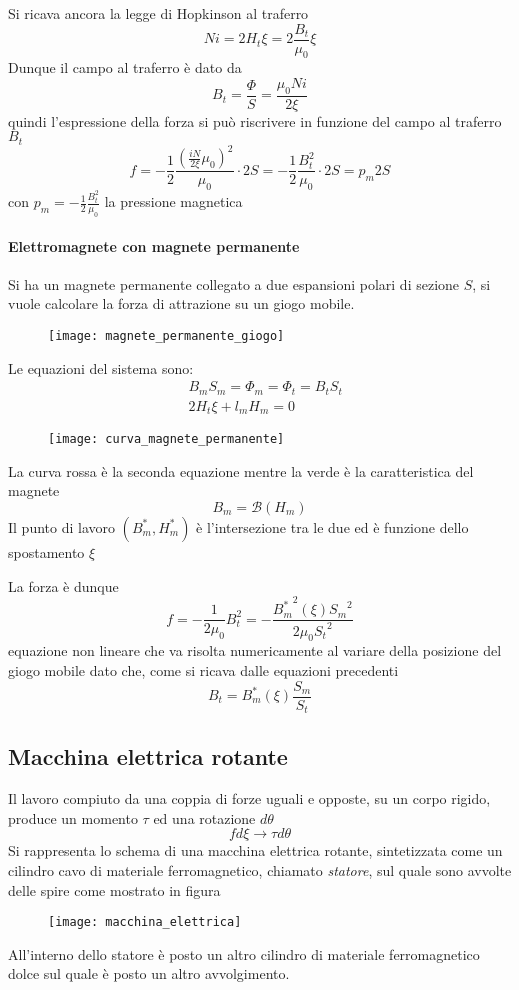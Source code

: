 Si ricava ancora la legge di Hopkinson al traferro
$$
Ni = 2H_t\xi = 2\frac{B_t}{\mu_0}\xi
$$
Dunque il campo al traferro è dato da
$$
B_t = \frac{\Phi}{S} = \frac{\mu_0Ni}{2\xi} 
$$
quindi l'espressione della forza si può riscrivere in funzione del campo al traferro $B_t$
$$
f = -\frac{1}{2}\frac{\left(\frac{iN}{2\xi}\mu_0\right)^2}{\mu_0} \cdot 2S = -\frac{1}{2}\frac{B_t^2}{\mu_0}\cdot2S
= p_m2S
$$
con $p_m = -\frac{1}{2}\frac{B_t^2}{\mu_0}$ la pressione magnetica
\newpage
\paragraph{Elettromagnete con magnete permanente}
Si ha un magnete permanente collegato a due espansioni polari di sezione $S$, si vuole calcolare la forza di 
attrazione su un giogo mobile.
\begin{figure}[H]
\centering
\texttt{[image: magnete\_permanente\_giogo]}
\end{figure}
Le equazioni del sistema sono:
$$\begin{aligned}
&B_mS_m = \Phi_m = \Phi_t = B_tS_t\\
&2H_t\xi + l_mH_m = 0
\end{aligned}
$$
\begin{figure}[H]
\centering
\texttt{[image: curva\_magnete\_permanente]}
\end{figure}
La curva rossa è la seconda equazione mentre la verde è la caratteristica del magnete
$$
B_m = \mathcal{B}(H_m)
$$
Il punto di lavoro $(B_m^*,H_m^*)$ è l'intersezione tra le due ed è funzione dello spostamento $\xi$

La forza è dunque
$$
f = -\frac{1}{2\mu_0}B_t^2 = -\frac{{B_m^*}^2(\xi){S_m}^2}{2\mu_0 {S_t}^2}
$$
equazione non lineare che va risolta numericamente al variare della posizione del giogo mobile
dato che, come si ricava dalle equazioni precedenti
$$
B_t = B_m^*(\xi)\frac{S_m}{S_t}
$$

\newpage
\subsection{Macchina elettrica rotante}
Il lavoro compiuto da una coppia di forze uguali e opposte, su un corpo rigido, produce un momento $\tau$
ed una rotazione $d\theta$
$$
fd\xi \rightarrow \tau d\theta
$$
Si rappresenta lo schema di una macchina elettrica rotante, sintetizzata come un cilindro cavo
di materiale ferromagnetico, chiamato \textit{statore}, sul quale sono avvolte delle spire come mostrato in figura
\begin{figure}[H]
\centering
\texttt{[image: macchina\_elettrica]}
\end{figure}
All'interno dello statore è posto un altro cilindro di materiale ferromagnetico dolce sul quale è posto
un altro avvolgimento.

